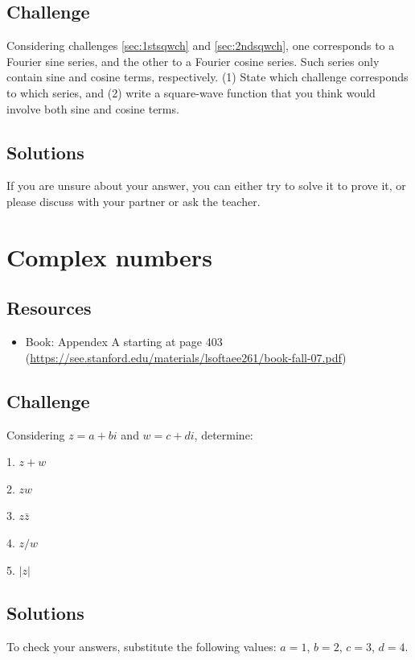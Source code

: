 \subsection*{Challenge}
Considering challenges \ref{sec:1stsqwch} and \ref{sec:2ndsqwch}, one corresponds to a Fourier sine series, and the other to a Fourier cosine series. Such series only contain sine and cosine terms, respectively. (1) State which challenge corresponds to which series, and (2) write a square-wave function that you think would involve both sine and cosine terms.

\subsection*{Solutions}
If you are unsure about your answer, you can either try to solve it to prove it, or please discuss with your partner or ask the teacher.



\newpage
\section{Complex numbers}

\subsection*{Resources}
\begin{itemize}
    \item Book: Appendex A starting at page 403 (\url{https://see.stanford.edu/materials/lsoftaee261/book-fall-07.pdf})
\end{itemize}

\subsection*{Challenge}
Considering $z=a+bi$ and $w=c+di$, determine:

1. $z + w$

2. $zw$

3. $z \bar{z}$

4. $z/w$

5. $|z|$

\subsection*{Solutions}
To check your answers, substitute the following values: $a=1$, $b=2$, $c=3$, $d=4$.


